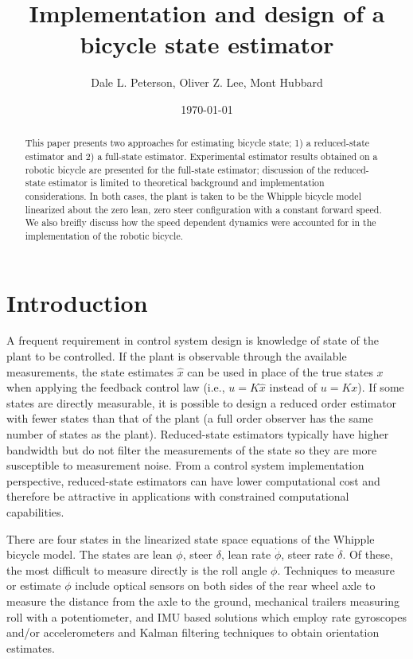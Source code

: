 \documentclass[letterpaper,11pt]{article}
\begin{document}
\title{Implementation and design of a bicycle state estimator}
\author{Dale L. Peterson, Oliver Z. Lee, Mont Hubbard}
\date{\today}
\maketitle

\begin{abstract}
This paper presents two approaches for estimating bicycle state; 1) a
reduced-state estimator and 2) a full-state estimator. Experimental estimator
results obtained on a robotic bicycle are presented for the full-state
estimator; discussion of the reduced-state estimator is limited to theoretical
background and implementation considerations. In both cases, the plant is taken
to be the Whipple bicycle model linearized about the zero lean, zero steer
configuration with a constant forward speed.  We also breifly discuss how the
speed dependent dynamics were accounted for in the implementation of the
robotic bicycle.
\end{abstract}

\section{Introduction} \label{sec:introduction}
A frequent requirement in control system design is knowledge of state of the
plant to be controlled. If the plant is observable through the available
measurements, the state estimates $\hat{x}$ can be used in place of the true
states $x$ when applying the feedback control law (i.e., $u=K\hat{x}$ instead
of $u=Kx$). If some states are directly measurable, it is possible to design a
reduced order estimator~\cite{Bryson1970} with fewer states than that of the
plant (a full order observer has the same number of states as the plant).
Reduced-state estimators typically have higher bandwidth but do not filter the
measurements of the state so they are more susceptible to measurement noise.
From a control system implementation perspective, reduced-state estimators can
have lower computational cost and therefore be attractive in applications with
constrained computational capabilities.

There are four states in the linearized state space equations of the Whipple
bicycle model. The states are lean $\phi$, steer $\delta$, lean rate
$\dot{\phi}$, steer rate $\dot{\delta}$.  Of these, the most difficult to
measure directly is the roll angle $\phi$. Techniques to measure or estimate
$\phi$ include optical sensors on both sides of the rear wheel axle to measure
the distance from the axle to the ground, mechanical trailers measuring roll
with a potentiometer, and IMU based solutions which employ rate gyroscopes
and/or accelerometers and Kalman filtering techniques to obtain orientation
estimates\cite{Boniolo2008}.
\end{document}
